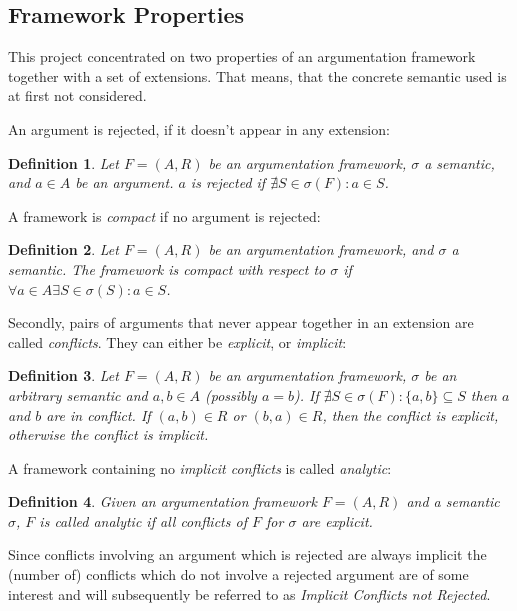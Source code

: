 \documentclass[parskip=half]{scrartcl}
\newtheorem{definition}{Definition}
\begin{document}
\subsection{Framework Properties} \label{framework_props}
This project concentrated on two properties of an argumentation framework
together with a set of extensions. That means, that the concrete semantic used
is at first not considered.

An argument is rejected, if it doesn't appear in any extension:

\begin{definition}
Let $F=(A,R)$ be an argumentation framework, $\sigma$ a semantic, and $a\in A$
be an argument. $a$ is \emph{rejected} if $\nexists S\in\sigma(F): a\in S$.
\end{definition}

A framework is \emph{compact} if no argument is rejected:

\begin{definition}
Let $F=(A,R)$ be an argumentation framework, and $\sigma$ a semantic.  The
framework is \emph{compact} with respect to $\sigma$ if $\forall a\in A\exists
S\in\sigma(S):a\in S$.
\end{definition}

Secondly, pairs of arguments that never appear together in an extension
are called \emph{conflicts}. They can either be \emph{explicit}, or
\emph{implicit}:
\begin{definition}
  Let $F=(A,R)$ be an argumentation framework, $\sigma$ be an arbitrary semantic
  and $a, b\in A$ (possibly $a = b$). If $\nexists S \in \sigma(F): \{a,b\} \subseteq S$ then $a$ and
  $b$ are in \emph{conflict}. If $(a, b) \in R$ or $(b, a)\in R$, then the
  conflict is \emph{explicit}, otherwise the conflict is \emph{implicit}.
\end{definition}

A framework containing no \emph{implicit conflicts} is called \emph{analytic}:

\begin{definition}
Given an argumentation framework $F=(A,R)$ and a semantic $\sigma$, $F$ is
called \emph{analytic} if all conflicts of $F$ for $\sigma$ are explicit.
\end{definition}

Since conflicts involving an argument which is rejected are always
implicit the (number of) conflicts which do not involve a rejected
argument are of some interest and will subsequently be referred to as
\emph{Implicit Conflicts not Rejected}.
\end{document}
